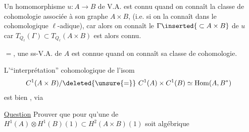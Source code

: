 Un homomorphisme $u:A\longrightarrow B$ de V.A. est connu quand on connaît la classe de cohomologie associée à son graphe  $A\times B$,
 (i.e. si on la connaît   dans le  cohomologique $\ell$-adique), car alors on connaît le  $\Gamma\inserted{{}\subset A\times B}$ de $u$ car $T_{Q_\ell}(\Gamma)\subset T_{Q_\ell}(A\times B)$ est alors connu.

\uline{} $=$, une ss-V.A. de $A$ est connue quand on connaît sa classe de cohomologie.

L'``interprétation'' cohomologique de l'isom
\[
C^1(A\times B)/\deleted{\unsure{=}}\ C^1(A)\times C^1(B)\simeq\operatorname{Hom}(A,B^*)
\]
est bien , via

\uline{Question} Prouver que pour qu'une  de $H^1(A)\otimes H^1(B)(1)\subset H^2(A\times B)(1)$ soit algébrique

